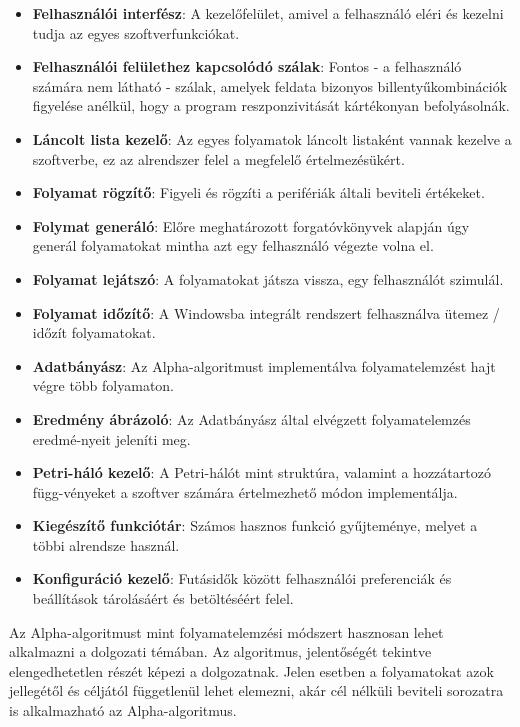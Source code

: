 \begin{itemize}
	\item \textbf{Felhasználói interfész}: A kezelőfelület, amivel a felhasználó eléri és kezelni tudja az egyes szoftverfunkciókat.
	\item \textbf{Felhasználói felülethez kapcsolódó szálak}: Fontos - a felhasználó számára nem látható - szálak, amelyek feldata bizonyos billentyűkombinációk figyelése anélkül, hogy a program reszponzivitását kártékonyan befolyásolnák.
	\item \textbf{Láncolt lista kezelő}: Az egyes folyamatok láncolt listaként vannak kezelve a szoftverbe, ez az alrendszer felel a megfelelő értelmezésükért. 
	\item \textbf{Folyamat rögzítő}: Figyeli és rögzíti a perifériák általi beviteli értékeket.
	\item \textbf{Folymat generáló}: Előre meghatározott forgatóvkönyvek alapján úgy generál folyamatokat mintha azt egy felhasználó végezte volna el.
	\item \textbf{Folyamat lejátszó}: A folyamatokat játsza vissza, egy felhasználót szimulál.
	\item \textbf{Folyamat időzítő}: A Windowsba integrált rendszert felhasználva ütemez / időzít folyamatokat.
	\item \textbf{Adatbányász}: Az Alpha-algoritmust implementálva folyamatelemzést hajt végre több folyamaton.
	\item \textbf{Eredmény ábrázoló}: Az Adatbányász által elvégzett folyamatelemzés eredmé\hyp{}nyeit jeleníti meg.
	\item \textbf{Petri-háló kezelő}: A Petri-hálót mint struktúra, valamint a hozzátartozó függ\hyp{}vényeket a szoftver számára értelmezhető módon implementálja.
	\item \textbf{Kiegészítő funkciótár}: Számos hasznos funkció gyűjteménye, melyet a többi alrendsze használ.
	\item \textbf{Konfiguráció kezelő}: Futásidők között felhasználói preferenciák és beállítások tárolásáért és betöltéséért felel.
\end{itemize}


Az Alpha-algoritmust mint folyamatelemzési módszert hasznosan lehet alkalmazni a dolgozati témában. Az algoritmus, jelentőségét tekintve elengedhetetlen részét képezi a dolgozatnak. Jelen esetben a folyamatokat azok jellegétől és céljától függetlenül lehet elemezni, akár cél nélküli beviteli sorozatra is alkalmazható az Alpha-algoritmus.

